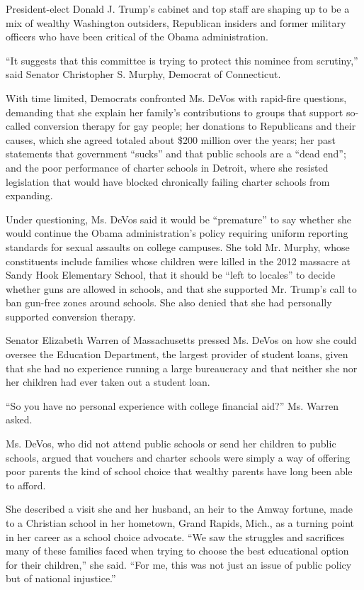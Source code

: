 President-elect Donald J. Trump's cabinet and top staff are shaping up
to be a mix of wealthy Washington outsiders, Republican insiders and
former military officers who have been critical of the Obama
administration.

``It suggests that this committee is trying to protect this nominee from
scrutiny,'' said Senator Christopher S. Murphy, Democrat of Connecticut.

With time limited, Democrats confronted Ms. DeVos with rapid-fire
questions, demanding that she explain her family's contributions to
groups that support so-called conversion therapy for gay people; her
donations to Republicans and their causes, which she agreed totaled
about \$200 million over the years; her past statements that government
``sucks'' and that public schools are a ``dead end''; and the poor
performance of charter schools in Detroit, where she resisted
legislation that would have blocked chronically failing charter schools
from expanding.

Under questioning, Ms. DeVos said it would be ``premature'' to say
whether she would continue the Obama administration's policy requiring
uniform reporting standards for sexual assaults on college campuses. She
told Mr. Murphy, whose constituents include families whose children were
killed in the 2012 massacre at Sandy Hook Elementary School, that it
should be ``left to locales'' to decide whether guns are allowed in
schools, and that she supported Mr. Trump's call to ban gun-free zones
around schools. She also denied that she had personally supported
conversion therapy.

Senator Elizabeth Warren of Massachusetts pressed Ms. DeVos on how she
could oversee the Education Department, the largest provider of student
loans, given that she had no experience running a large bureaucracy and
that neither she nor her children had ever taken out a student loan.

``So you have no personal experience with college financial aid?'' Ms.
Warren asked.

Ms. DeVos, who did not attend public schools or send her children to
public schools, argued that vouchers and charter schools were simply a
way of offering poor parents the kind of school choice that wealthy
parents have long been able to afford.

She described a visit she and her husband, an heir to the Amway fortune,
made to a Christian school in her hometown, Grand Rapids, Mich., as a
turning point in her career as a school choice advocate. ``We saw the
struggles and sacrifices many of these families faced when trying to
choose the best educational option for their children,'' she said. ``For
me, this was not just an issue of public policy but of national
injustice.''

